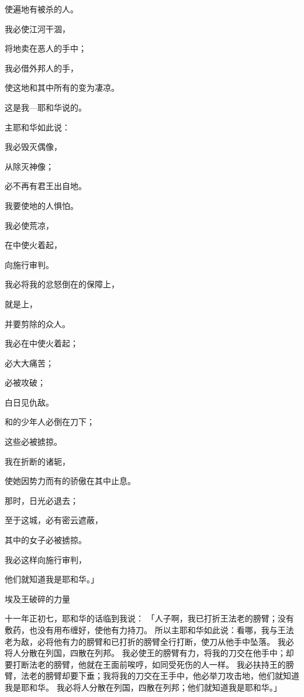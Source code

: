 {\par }{\Q 使遍地有被杀的人。
\par }{\Q {}我必使江河干涸，
\par }{\Q 将地卖在恶人的手中；
\par }{\Q 我必借外邦人的手，
\par }{\Q 使这地和其中所有的变为凄凉。
\par }{\Q 这是我—耶和华说的。
\par }{\BB \par }{\Q {}主耶和华如此说：
\par }{\Q 我必毁灭偶像，
\par }{\Q 从{}除灭神像；
\par }{\Q 必不再有君王出自{}地。
\par }{\Q 我要使{}地的人惧怕。
\par }{\Q {}我必使{}荒凉，
\par }{\Q 在{}中使火着起，
\par }{\Q 向{}施行审判。
\par }{\Q {}我必将我的忿怒倒在{}的保障上，
\par }{\Q 就是{}上，
\par }{\Q 并要剪除{}的众人。
\par }{\Q {}我必在{}中使火着起；
\par }{必大大痛苦；
\par }{必被攻破；
\par }{白日见仇敌。
\par }{\Q {}和{}的少年人必倒在刀下；
\par }{\Q 这些{}必被掳掠。
\par }{\Q {}我在{}折断{}的诸轭，
\par }{\Q 使她因势力而有的骄傲在其中止息。
\par }{\Q 那时，日光必退去；
\par }{\Q 至于这城，必有密云遮蔽，
\par }{\Q 其中的女子必被掳掠。
\par }{\Q {}我必这样向{}施行审判，
\par }{\Q 他们就知道我是耶和华。」
\par }{\SH 埃及王破碎的力量
\par }{\PP {}十一年正{}初七{}，耶和华的话临到我说：
「人子啊，我已打折{}王法老的膀臂；没有敷药，也没有用布缠好，使他有力持刀。
所以主耶和华如此说：看哪，我与{}王法老为敌，必将他有力的膀臂和已打折的膀臂全行打断，使刀从他手中坠落。
我必将{}人分散在列国，四散在列邦。
我必使{}王的膀臂有力，将我的刀交在他手中；却要打断法老的膀臂，他就在{}王面前唉哼，如同受死伤的人一样。
我必扶持{}王的膀臂，法老的膀臂却要下垂；我将我的刀交在{}王手中，他必举刀攻击{}地，他们就知道我是耶和华。
我必将{}人分散在列国，四散在列邦；他们就知道我是耶和华。」

}
